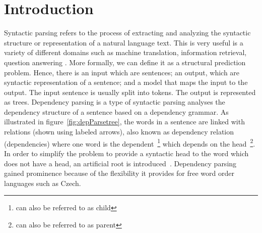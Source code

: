 \chapter{Introduction}


Syntactic parsing refers to the process of extracting and analyzing the syntactic structure or representation of a natural language text. This is very useful is a variety of different domains such as machine translation, information retrieval, question answering \cite{hall2008transition}. More formally, we can define it as a structural prediction problem. Hence, there is an input which are sentences; an output, which are syntactic representation of a sentence;  and a model that maps the input to the output. The input sentence is usually split into tokens. The output is represented as trees. Dependency parsing is a type of syntactic parsing analyses the dependency structure of a sentence based on a dependency grammar. As illustrated in figure~\ref{fig:depParsetree}, the words in a sentence are linked with relations (shown using labeled arrows), also known as dependency relation (dependencies) where one word is the dependent~\footnote{can also be referred to as child} which depends on the head~\footnote{can also be referred to as parent}. In order to simplify the problem to provide a syntactic head to the word which does not have a head, an artificial root is introduced~\cite{kubler2009dependency}. Dependency parsing gained prominence because of the flexibility it provides for free word order languages such as Czech.

